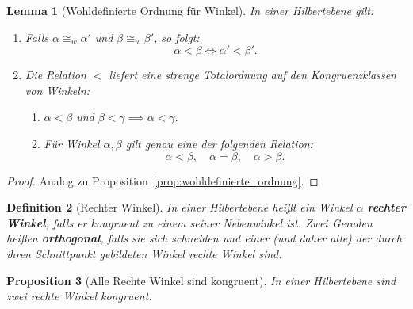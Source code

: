 \documentclass[a4paper,12pt]{article}
\theoremstyle{break}
\newtheorem{definition}{Definition}[section]
\newtheorem{proposition}[definition]{Proposition}
\newtheorem{lemma}[definition]{Lemma}
\begin{document}
\begin{lemma}[Wohldefinierte Ordnung für Winkel]\label{lemma:wohldefiniert_ordnung_winkel}
In einer Hilbertebene gilt:
\begin{enumerate}
    \item Falls \(\alpha \cong_w \alpha'\) und \(\beta \cong_w \beta'\), so folgt:
    \[
    \alpha < \beta \iff \alpha' < \beta'.
    \]
    \item Die Relation \(<\) liefert eine strenge Totalordnung auf den Kongruenzklassen von Winkeln:
    \begin{enumerate}
        \item[\((2.1)\)] \(\alpha < \beta\) und \(\beta < \gamma \implies \alpha < \gamma.\)
        \item[\((2.2)\)] Für Winkel \(\alpha, \beta\) gilt genau eine der folgenden Relation:
        \[
        \alpha < \beta, \quad \alpha = \beta, \quad \alpha > \beta.
        \]
    \end{enumerate}
\end{enumerate}
\end{lemma}

\begin{proof}
Analog zu Proposition~\ref{prop:wohldefinierte_ordnung}.
\end{proof}

\begin{definition}[Rechter Winkel]
In einer Hilbertebene heißt ein Winkel \(\alpha\) \textbf{rechter Winkel}, falls er kongruent zu einem seiner Nebenwinkel ist.
Zwei Geraden heißen \textbf{orthogonal}, falls sie sich schneiden und einer (und daher alle) der durch ihren Schnittpunkt gebildeten Winkel rechte Winkel sind.
\end{definition}

\begin{proposition}[Alle Rechte Winkel sind kongruent]\label{prop:rechte_winkel_kongruent}
In einer Hilbertebene sind zwei rechte Winkel kongruent.
\end{proposition}
\end{document}
